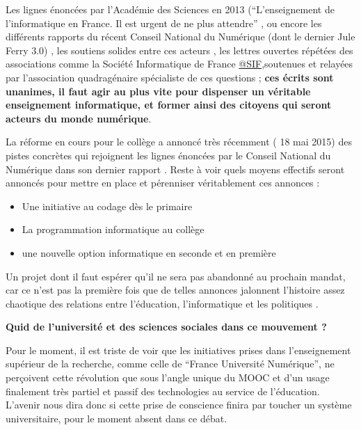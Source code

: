 Les lignes énoncées par l'Académie des Sciences en 2013 (\enquote{L’enseignement de l’informatique en France. Il est urgent de ne plus attendre} \autocite{AScience2013}, ou encore les différents rapports du récent Conseil National du Numérique (dont le dernier Jule Ferry 3.0) \autocite{CNNum2014}, les soutiens solides entre ces acteurs , les lettres ouvertes répétées des associations comme la Société Informatique de France \href{http://www.societe-informatique-de-france.fr/lettre-ouverte-a-monsieur-francois-hollande-president-de-la-republique-concernant-lenseignement-de-linformatique/lettre-ouverte-a-monsieur-francois-hollande-president-de-la-republique-concernant-lenseignement-de-linformatique-2/}{@SIF},soutenues et relayées par l'association quadragénaire spécialiste de ces questions \textcite{EPI2014}; \textbf{ces écrits sont unanimes, il faut agir au plus vite pour dispenser un véritable enseignement informatique, et former ainsi des citoyens qui seront acteurs du monde numérique}.

La réforme en cours pour le collège a annoncé très récemment (\autocite{SIF2015} 18 mai 2015) des pistes concrètes qui rejoignent les lignes énoncées  par le Conseil National du Numérique dans son dernier rapport \autocite{CNNum2014}. Reste à voir quels moyens effectifs seront annoncés pour mettre en place et pérenniser véritablement ces annonces :
\begin{itemize}[label=\textbullet]
\item Une initiative au codage dès le primaire
\item La programmation informatique au collège
\item une nouvelle option informatique en seconde et en première
\end{itemize}

Un projet dont il faut espérer qu'il ne sera pas abandonné au prochain mandat, car ce n'est pas la première fois que de telles annonces jalonnent l'histoire assez chaotique des relations entre l'éducation, l'informatique et les politiques .

\textbf{Quid de l'université et des sciences sociales dans ce mouvement ?}

Pour le moment, il est triste de voir que les initiatives prises dans l'enseignement supérieur de la recherche, comme celle de \enquote{France Université Numérique}, ne perçoivent cette révolution que sous l'angle unique du MOOC et d'un usage finalement très partiel et passif des technologies au service de l'éducation. L'avenir nous dira donc si cette prise de conscience finira par toucher un système universitaire, pour le moment absent dans ce débat.

